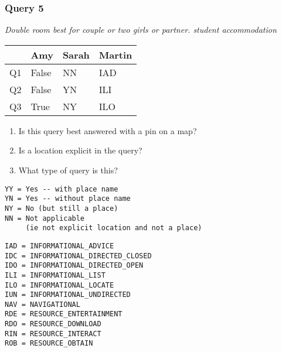 \begin{frame}[fragile]
\frametitle{Query 5}
\vspace{1em}

\emph{Double room  best for couple or two girls or partner. student accommodation}

\vfill

\begin{table}
  \centering
  \begin{tabular}{ l l l l }
    & \textbf{Amy} & \textbf{Sarah} & \textbf{Martin}\\
    \toprule
    Q1 & False & NN & IAD\\
Q2 & False & YN & ILI\\
Q3 & True & NY & ILO\\
    \bottomrule
  \end{tabular}
\end{table}

\vfill

\tiny{

\begin{enumerate}
\item Is this query best answered with a pin on a map?
\item Is a location explicit in the query?
\item What type of query is this?
\end{enumerate}

\vfill

\begin{multicols}{2}
\begin{verbatim}
YY = Yes -- with place name
YN = Yes -- without place name
NY = No (but still a place)
NN = Not applicable 
     (ie not explicit location and not a place)
\end{verbatim}

\columnbreak
\begin{verbatim}
IAD = INFORMATIONAL_ADVICE
IDC = INFORMATIONAL_DIRECTED_CLOSED
IDO = INFORMATIONAL_DIRECTED_OPEN
ILI = INFORMATIONAL_LIST
ILO = INFORMATIONAL_LOCATE
IUN = INFORMATIONAL_UNDIRECTED
NAV = NAVIGATIONAL
RDE = RESOURCE_ENTERTAINMENT
RDO = RESOURCE_DOWNLOAD
RIN = RESOURCE_INTERACT
ROB = RESOURCE_OBTAIN
\end{verbatim}
\end{multicols}
}

\end{frame}


